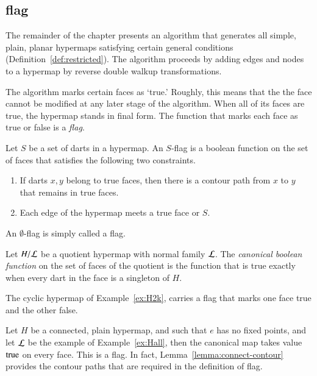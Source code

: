 \subsection{flag}

The remainder of the chapter presents an algorithm that
generates all simple, plain, planar hypermaps satisfying certain general
conditions (Definition~\ref{def:restricted}).   The algorithm  proceeds by adding edges and nodes to a hypermap by reverse double walkup transformations.

The algorithm  marks certain faces as `true.'
Roughly, this  means that the the face cannot be modified
at any later stage of the algorithm.   When all of its faces
are true, the hypermap stands in final form.
The function that marks each face as true or false is a
{\it flag}.


\begin{definition}[flag]  Let $S$ be a set of darts in a hypermap.  
An $S$-flag is a boolean function on the set of faces that satisfies the following two constraints.
\begin{enumerate}
    \item If darts $x,y$ belong to true faces,
    then there is a contour path from $x$ to $y$ that remains
    in true faces.
    \item Each edge of the hypermap meets a true face or $S$.
    \end{enumerate}
An $\emptyset$-flag is simply called a flag.
\end{definition}

\begin{definition} Let $H/{\cal L}$ be a quotient hypermap with normal family $\cal L$.  The {\it canonical boolean function} on the set of faces of the quotient is the function that is true exactly when every dart in the face is a singleton of $H$.
\end{definition}

\begin{example} The cyclic hypermap of Example~\ref{ex:H2k}, carries a flag that marks one face true and the other false.
\end{example}

\begin{example} Let $H$ be a connected, plain hypermap, and such that $e$ has no fixed points, and let $\cal L$ be the example of Example~\ref{ex:Hall}, then the canonical map takes value ${\operatorname{true}}$ on every face.  This is a flag. In fact, Lemma~\ref{lemma:connect-contour} provides the contour paths that are required in the definition of flag.
\end{example}

